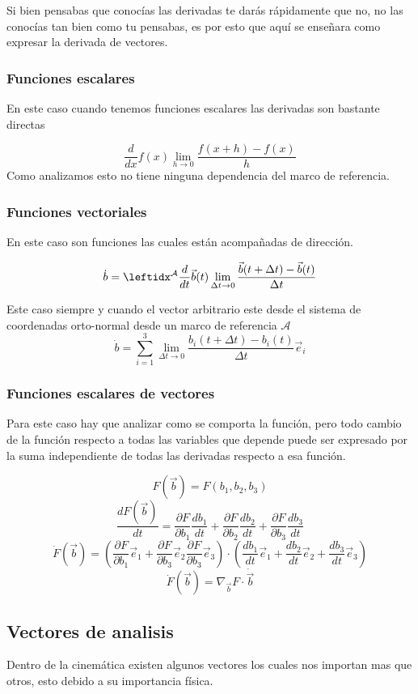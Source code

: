 Si bien pensabas que conocías las derivadas te darás rápidamente que no, no las conocías tan bien como tu pensabas, es por esto que aquí se enseñara como expresar la derivada de vectores.

\subsubsection{Funciones escalares}
En este caso cuando tenemos funciones escalares las derivadas son bastante directas

$$\dfrac{d}{dx}f(x)\lim_{h\to 0}\dfrac{f(x+h)-f(x)}{h}$$ Como analizamos esto no tiene ninguna dependencia del marco de referencia.
\subsubsection{Funciones vectoriales}

En este caso son funciones las cuales están acompañadas de dirección.


$$\dot{b}= \der{\Vec{b}(t)}{A}\lim_{\Delta t\to 0}\dfrac{\vec{b}(t+\Delta t)-\Vec{b}(t)}{\Delta t}$$ 

Este caso siempre y cuando el vector arbitrario este desde el sistema de coordenadas orto-normal desde un marco de referencia $\mathcal{A}$
$$\dot{b}= \sum_{i=1}^3\lim_{\Delta t\to 0}\dfrac{b_i(t+\Delta t)-b_i(t)}{\Delta t}\Vec{e}_i$$ 

\subsubsection{Funciones escalares de vectores}
Para este caso hay que analizar como se comporta la función, pero todo cambio de la función respecto a todas las variables que depende puede ser expresado por la suma independiente de todas las derivadas respecto a esa función.

$$F(\Vec{b})=F(b_1,b_2,b_3)$$
$$\dfrac{d F(\Vec{b})}{dt}=\dfrac{\partial F}{\partial b_1}\dfrac{d b_1}{dt}+\dfrac{\partial F}{\partial b_2}\dfrac{d b_2}{dt}+\dfrac{\partial F}{\partial b_3}\dfrac{d b_3}{dt}$$
$$\dot F(\Vec{b})=\left(\dfrac{\partial F}{\partial b_1}\Vec{e}_1+\dfrac{\partial F}{\partial b_3}\Vec{e}_2\dfrac{\partial F}{\partial b_3}\Vec{e}_3\right)\cdot \left(\dfrac{d b_1}{dt}\Vec{e}_1+\dfrac{d b_2}{dt}\Vec{e}_2+\dfrac{d b_3}{dt}\Vec{e}_3\right)$$
$$\dot F(\Vec{b})=\nabla_{\Vec{b}}F\cdot \dot{\Vec{b}}$$
\subsection{Vectores de analisis}
Dentro de la cinemática existen algunos vectores los cuales nos importan mas que otros, esto debido a su importancia física.

